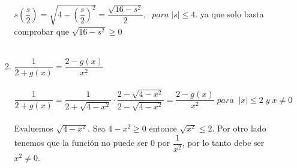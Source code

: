 \begin{enumerate}
\begin{enumerate}[\bfseries (a)]
                $s\left( \dfrac{s}{2} \right) = \sqrt{4 - \left( \dfrac{s}{2} \right)^2} = \dfrac{\sqrt{16 - s^2}}{2}, \; \; para \; |s| \leq 4$. ya que solo basta comprobar que $\sqrt{16 - s^2} \geq 0$\\\\
                \item $\dfrac{1}{2 +g(x)} = \dfrac{2-g(x)}{x^2}$\\\\ 
                $\dfrac{1}{2 +g(x)} = \dfrac{1}{2+ \sqrt{4-x^2}} \cdot \dfrac{2 - \sqrt{4-x^2}}{2 - \sqrt{4-x^2}} = \dfrac{2 - g(x)}{x^2}\; para \; \; |x| \leq 2 \; y \; x \neq 0$\\\\ 
                Evaluemos $\sqrt{4-x^2}$. Sea $4-x^2 \geq 0$ entonce $\sqrt{x^2} \leq 2$. Por otro lado tenemos que la función no puede ser $0$ por $\dfrac{1}{x^2}$, por lo tanto debe ser $x^2\neq 0$.\\\\ 
            \end{enumerate}


\end{enumerate}
